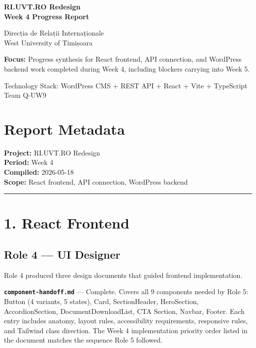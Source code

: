\documentclass[12pt,a4paper]{article}
\begin{document}
\begin{titlepage}
    \pagecolor{uvtDarkBlue}
    \color{white}
    \vspace*{2cm}
    {\Huge\bfseries RI.UVT.RO Redesign\\[0.25em] Week 4 Progress Report\par}
    \vspace{0.8cm}
    {\Large Direcția de Relații Internaționale\\ West University of Timișoara\par}
    \vspace{1.5cm}
    \begin{yellowbox}
        \color{textGray}
        \textbf{Focus:} Progress synthesis for React frontend, API connection, and WordPress backend work completed during Week 4, including blockers carrying into Week 5.
    \end{yellowbox}
    \vfill
    {\large Technology Stack: WordPress CMS + REST API + React + Vite + TypeScript\\ Team Q-UW9}
    \vspace{1cm}
\end{titlepage}
\nopagecolor
\color{textGray}
\tableofcontents
\newpage

\section*{Report Metadata}
\textbf{Project:} RI.UVT.RO Redesign\\
\textbf{Period:} Week 4\\
\textbf{Compiled:} 2026-05-18\\
\textbf{Scope:} React frontend, API connection, WordPress backend

\medskip\noindent\textcolor{uvtYellow}{\rule{\textwidth}{1.2pt}}\medskip

\section{1. React Frontend}\label{react-frontend}

\subsection{Role 4 --- UI Designer}\label{role-4-ui-designer}

Role 4 produced three design documents that guided frontend
implementation.

\textbf{\texttt{component-handoff.md}} --- Complete. Covers all 9
components needed by Role 5: Button (4 variants, 5 states), Card,
SectionHeader, HeroSection, AccordionSection, DocumentDownloadList, CTA
Section, Navbar, Footer. Each entry includes anatomy, layout rules,
accessibility requirements, responsive rules, and Tailwind class
direction. The Week 4 implementation priority order listed in the
document matches the sequence Role 5 followed.
\end{document}
